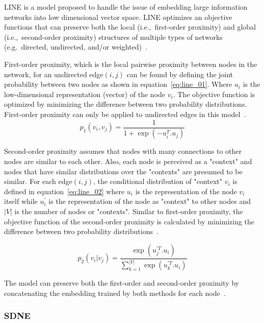\ac{LINE} is a model proposed to handle the issue of embedding large information networks into low dimensional vector space.
\ac{LINE} optimizes an objective functions that can preserve both the local (i.e.,~first-order proximity) and global (i.e.,~second-order proximity) structures of multiple types of networks (e.g.~directed, undirected, and/or weighted)~\cite{tang_line:_2015}.

First-order proximity, which is the local pairwise proximity between nodes in the network, for an undirected edge$(i,j)$ can be found by defining the joint probability between two nodes as shown in equation~\ref{eq:line_01}.
Where $u_{i}$ is the low-dimensional representation (vector) of the node $v_{i}$.
The objective function is optimized by minimizing the difference between two probability distributions.
First-order proximity can only be applied to undirected edges in this model~\cite{tang_line:_2015}.
\begin{equation}
    \label{eq:line_01}
    p_{1}(v_{i}, v_{j}) = \frac{1}{1+ \exp{(-u_{i}^T .u_{j})}}
\end{equation}

Second-order proximity assumes that nodes with many connections to other nodes are similar to each other.
Also, each node is perceived as a "context" and nodes that have similar distributions over the "contexts" are presumed to be similar.
For each edge$(i,j)$, the conditional distribution of "context" $v_{i}$ is defined in equation~\ref{eq:line_02} where $u_{i}$ is the representation of the node $v_{i}$ itself while $u_{i}^{'}$ is the representation of the node as "context" to other nodes and $|V|$ is the number of nodes or "contexts".
Similar to first-order proximity, the objective function of the second-order proximity is calculated by minimizing the difference between two probability distributions~\cite{tang_line:_2015}.

\begin{equation}
    \label{eq:line_02}
    p_{2}(v_{i}| v_{j}) = \frac{\exp(u_{j}^{'T} .u_{i})}{\sum_{k=1}^{|V|} \exp{(u_{k}^{'T} .u_{i})}}
\end{equation}

The model can preserve both the first-order and second-order proximity by concatenating the embedding trained by both methods for each node~\cite{tang_line:_2015}.

\subsubsection{SDNE}\label{subsection:SDNE}

